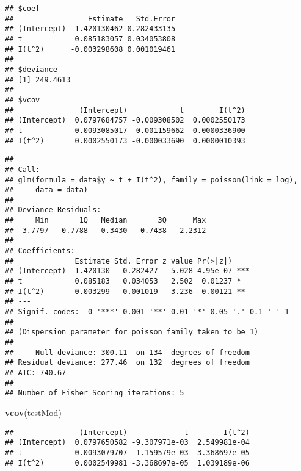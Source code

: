 \documentclass[
]{article}
\newenvironment{Shaded}{\begin{snugshade}}{\end{snugshade}}
\newcommand{\CommentTok}[1]{\textcolor[rgb]{0.56,0.35,0.01}{\textit{#1}}}
\newcommand{\DataTypeTok}[1]{\textcolor[rgb]{0.13,0.29,0.53}{#1}}
\newcommand{\DecValTok}[1]{\textcolor[rgb]{0.00,0.00,0.81}{#1}}
\newcommand{\KeywordTok}[1]{\textcolor[rgb]{0.13,0.29,0.53}{\textbf{#1}}}
\newcommand{\NormalTok}[1]{#1}
\newcommand{\OperatorTok}[1]{\textcolor[rgb]{0.81,0.36,0.00}{\textbf{#1}}}
\newcommand{\StringTok}[1]{\textcolor[rgb]{0.31,0.60,0.02}{#1}}
\begin{document}
\begin{verbatim}
## $coef
##                 Estimate   Std.Error
## (Intercept)  1.420130462 0.282433135
## t            0.085183057 0.034053808
## I(t^2)      -0.003298608 0.001019461
## 
## $deviance
## [1] 249.4613
## 
## $vcov
##               (Intercept)            t        I(t^2)
## (Intercept)  0.0797684757 -0.009308502  0.0002550173
## t           -0.0093085017  0.001159662 -0.0000336900
## I(t^2)       0.0002550173 -0.000033690  0.0000010393
\end{verbatim}

\begin{Shaded}
\end{Shaded}

\begin{verbatim}
## 
## Call:
## glm(formula = data$y ~ t + I(t^2), family = poisson(link = log), 
##     data = data)
## 
## Deviance Residuals: 
##     Min       1Q   Median       3Q      Max  
## -3.7797  -0.7788   0.3430   0.7438   2.2312  
## 
## Coefficients:
##              Estimate Std. Error z value Pr(>|z|)    
## (Intercept)  1.420130   0.282427   5.028 4.95e-07 ***
## t            0.085183   0.034053   2.502  0.01237 *  
## I(t^2)      -0.003299   0.001019  -3.236  0.00121 ** 
## ---
## Signif. codes:  0 '***' 0.001 '**' 0.01 '*' 0.05 '.' 0.1 ' ' 1
## 
## (Dispersion parameter for poisson family taken to be 1)
## 
##     Null deviance: 300.11  on 134  degrees of freedom
## Residual deviance: 277.46  on 132  degrees of freedom
## AIC: 740.67
## 
## Number of Fisher Scoring iterations: 5
\end{verbatim}

\begin{Shaded}
\begin{Highlighting}[]
\KeywordTok{vcov}\NormalTok{(testMod)}
\end{Highlighting}
\end{Shaded}

\begin{verbatim}
##               (Intercept)             t        I(t^2)
## (Intercept)  0.0797650582 -9.307971e-03  2.549981e-04
## t           -0.0093079707  1.159579e-03 -3.368697e-05
## I(t^2)       0.0002549981 -3.368697e-05  1.039189e-06
\end{verbatim}
\end{document}
